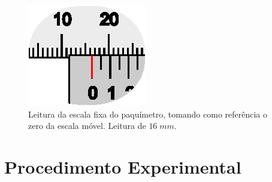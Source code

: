 \begin{figure}[!htb]
\centering
\includegraphics[scale=1.5]{figs/paquimetro005_zoom1_test.eps}
\caption{Leitura da escala fixa do paquímetro, tomando como referência o zero da escala móvel. Leitura de $16\;mm$.}
\label{fig:paquimetro005_zoom}
\end{figure}





\section{Procedimento Experimental}

